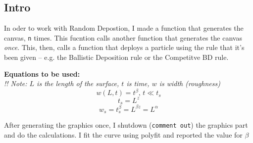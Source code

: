 \documentclass[12pt]{article}
\begin{document}
	\subsection{Intro}
	In oder to work with Random Depostion, I made a function that generates the canvas,
	\texttt{n} times. This fucntion calls another function that generates the canvas
	\emph{once}. This, then, calls a function that deploys a particle using the rule that it's been
	given -- e.g. the Ballistic Deposition rule or the Competitve BD rule.
	
	\textbf{Equations to be used:}\\
	\emph{!! Note: $L$ is the length of the surface, $t$ is time, $w$ is width (roughness)}
	\begin{equation}
		w(L, t) = t^{\beta}, \, t \ll t_s
		\label{eq:beta}
	\end{equation}
	\begin{equation}
		t_s = L^z
		\label{eq:z}
	\end{equation}
	\begin{equation}
		w_s = t_s^\beta = L^{\beta z} = L^\alpha
		\label{eq:alpha}
	\end{equation}
	
	After generating the graphics once, I shutdown (\texttt{comment out}) the graphics part and do the calculations. I fit the curve using polyfit and reported the value for $\beta$
\end{document}
